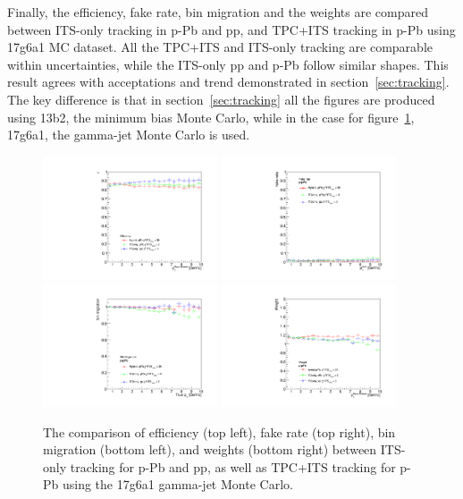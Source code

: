 Finally, the efficiency, fake rate, bin migration and the weights are compared between ITS-only tracking in p-Pb and pp, and TPC+ITS tracking in p-Pb using 17g6a1 MC dataset. All the TPC+ITS and ITS-only tracking are comparable within uncertainties, while the ITS-only pp and p-Pb follow similar shapes. This result agrees with acceptations and trend demonstrated in section~\ref{sec:tracking}. The key difference is that in section~\ref{sec:tracking} all the figures are produced using 13b2, the minimum bias Monte Carlo, while in the case for figure~\ref{fig:TPCITSpp_pPbCompare}, 17g6a1, the gamma-jet Monte Carlo is used. 
\begin{figure}[h]
\center
\includegraphics[width=0.46\textwidth]{Checks_Systematics/ITSchi2_study_efficiency.pdf}
\includegraphics[width=0.46\textwidth]{Checks_Systematics/ITSchi2_study_fakerate.pdf}
\includegraphics[width=0.46\textwidth]{Checks_Systematics/ITSchi2_study_binMigration.pdf}
\includegraphics[width=0.46\textwidth]{Checks_Systematics/ITSchi2_study_weight.pdf}
\caption{The comparison of efficiency (top left), fake rate (top right), bin migration (bottom left), and weights (bottom right) between ITS-only tracking for p-Pb and pp, as well as TPC+ITS tracking for p-Pb using the 17g6a1 gamma-jet Monte Carlo.\cite{PhysRevC.101.065204}}
\label{fig:TPCITSpp_pPbCompare}

\end{figure}

